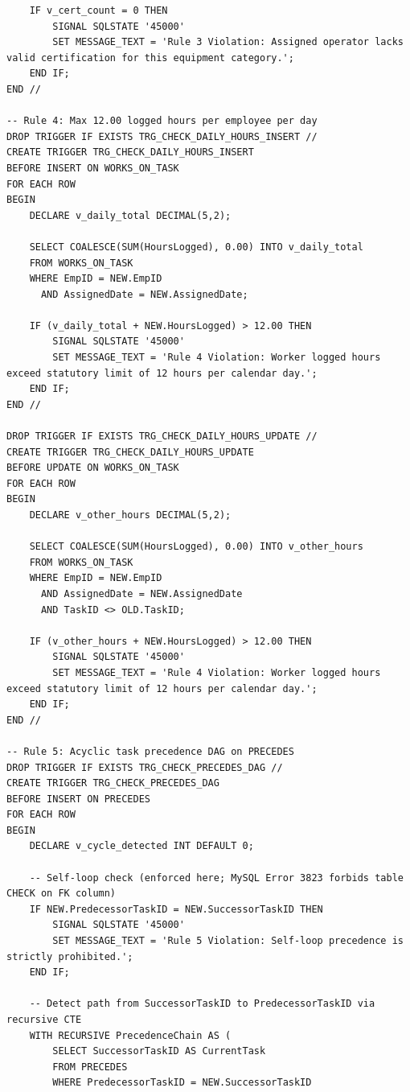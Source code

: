 \documentclass[a4paper,12pt]{report}
\begin{document}
\begin{lstlisting}
    IF v_cert_count = 0 THEN
        SIGNAL SQLSTATE '45000'
        SET MESSAGE_TEXT = 'Rule 3 Violation: Assigned operator lacks valid certification for this equipment category.';
    END IF;
END //

-- Rule 4: Max 12.00 logged hours per employee per day
DROP TRIGGER IF EXISTS TRG_CHECK_DAILY_HOURS_INSERT //
CREATE TRIGGER TRG_CHECK_DAILY_HOURS_INSERT
BEFORE INSERT ON WORKS_ON_TASK
FOR EACH ROW
BEGIN
    DECLARE v_daily_total DECIMAL(5,2);

    SELECT COALESCE(SUM(HoursLogged), 0.00) INTO v_daily_total
    FROM WORKS_ON_TASK
    WHERE EmpID = NEW.EmpID
      AND AssignedDate = NEW.AssignedDate;

    IF (v_daily_total + NEW.HoursLogged) > 12.00 THEN
        SIGNAL SQLSTATE '45000'
        SET MESSAGE_TEXT = 'Rule 4 Violation: Worker logged hours exceed statutory limit of 12 hours per calendar day.';
    END IF;
END //

DROP TRIGGER IF EXISTS TRG_CHECK_DAILY_HOURS_UPDATE //
CREATE TRIGGER TRG_CHECK_DAILY_HOURS_UPDATE
BEFORE UPDATE ON WORKS_ON_TASK
FOR EACH ROW
BEGIN
    DECLARE v_other_hours DECIMAL(5,2);

    SELECT COALESCE(SUM(HoursLogged), 0.00) INTO v_other_hours
    FROM WORKS_ON_TASK
    WHERE EmpID = NEW.EmpID
      AND AssignedDate = NEW.AssignedDate
      AND TaskID <> OLD.TaskID;

    IF (v_other_hours + NEW.HoursLogged) > 12.00 THEN
        SIGNAL SQLSTATE '45000'
        SET MESSAGE_TEXT = 'Rule 4 Violation: Worker logged hours exceed statutory limit of 12 hours per calendar day.';
    END IF;
END //

-- Rule 5: Acyclic task precedence DAG on PRECEDES
DROP TRIGGER IF EXISTS TRG_CHECK_PRECEDES_DAG //
CREATE TRIGGER TRG_CHECK_PRECEDES_DAG
BEFORE INSERT ON PRECEDES
FOR EACH ROW
BEGIN
    DECLARE v_cycle_detected INT DEFAULT 0;

    -- Self-loop check (enforced here; MySQL Error 3823 forbids table CHECK on FK column)
    IF NEW.PredecessorTaskID = NEW.SuccessorTaskID THEN
        SIGNAL SQLSTATE '45000'
        SET MESSAGE_TEXT = 'Rule 5 Violation: Self-loop precedence is strictly prohibited.';
    END IF;

    -- Detect path from SuccessorTaskID to PredecessorTaskID via recursive CTE
    WITH RECURSIVE PrecedenceChain AS (
        SELECT SuccessorTaskID AS CurrentTask
        FROM PRECEDES
        WHERE PredecessorTaskID = NEW.SuccessorTaskID
        

\end{lstlisting}
\end{document}
